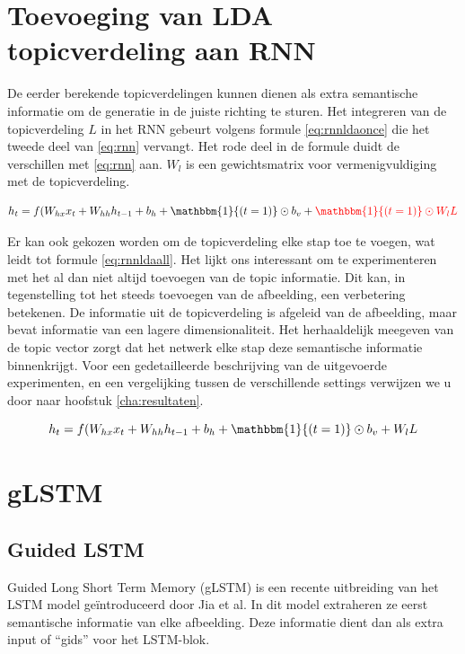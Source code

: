 \section{Toevoeging van LDA topicverdeling aan RNN}
De eerder berekende topicverdelingen kunnen dienen als extra semantische informatie om de generatie in de juiste richting te sturen. Het integreren van de topicverdeling $L$ in het RNN gebeurt volgens formule \eqref{eq:rnnldaonce} die het tweede deel van \eqref{eq:rnn} vervangt. Het rode deel in de formule duidt de verschillen met \eqref{eq:rnn} aan. $W_l$ is een gewichtsmatrix voor vermenigvuldiging met de topicverdeling.

\begin{equation}
    h_t = f(W_{hx} x_{t} + W_{hh} h_{t-1} + b_h + \mathbbm{1}{(t=1)} \odot b_v +\color{red}{\mathbbm{1}{(t=1)} \odot W_lL}
    \color{black}
    \label{eq:rnnldaonce}
\end{equation}

Er kan ook gekozen worden om de topicverdeling elke stap toe te voegen, wat leidt tot formule \eqref{eq:rnnldaall}. Het lijkt ons interessant om te experimenteren met het al dan niet altijd toevoegen van de topic informatie. Dit kan, in tegenstelling tot het steeds toevoegen van de afbeelding, een verbetering betekenen. De informatie uit de topicverdeling is afgeleid van de afbeelding, maar bevat informatie van een lagere dimensionaliteit. Het herhaaldelijk meegeven van de topic vector zorgt dat het netwerk elke stap deze semantische informatie binnenkrijgt. Voor een gedetailleerde beschrijving van de uitgevoerde experimenten, en een vergelijking tussen de verschillende settings verwijzen we u door naar hoofstuk \ref{cha:resultaten}.


\begin{equation}
    h_t = f(W_{hx} x_{t} + W_{hh} h_{t-1} + b_h + \mathbbm{1}{(t=1)} \odot b_v + W_lL
    \label{eq:rnnldaall}
\end{equation}


\section{gLSTM}
\subsection{Guided LSTM}
Guided Long Short Term Memory (gLSTM) is een recente uitbreiding van het LSTM model ge\"introduceerd door Jia et al.\cite{Fernando2015} In dit model extraheren ze eerst semantische informatie van elke afbeelding. Deze informatie dient dan als extra input of ``gids'' voor het LSTM-blok.


